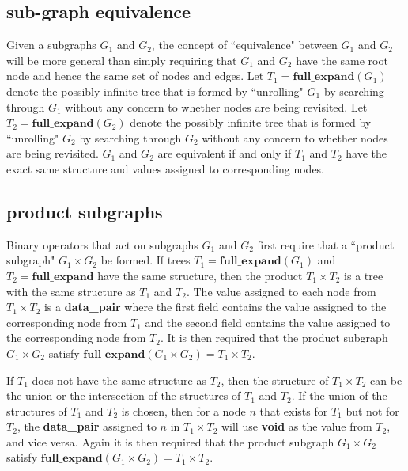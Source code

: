 \documentclass{article}
\begin{document}
\subsection{sub-graph equivalence}

Given a subgraphs \(G_1\) and \(G_2\), the concept of ``equivalence" between \(G_1\) and \(G_2\) will be more general than simply requiring that \(G_1\) and \(G_2\) have the same root node and hence the same set of nodes and edges. Let \(T_1 = \textbf{full\_expand}(G_1)\) denote the possibly infinite tree that is formed by ``unrolling" \(G_1\) by searching through \(G_1\) without any concern to whether nodes are being revisited. Let \(T_2 = \textbf{full\_expand}(G_2)\) denote the possibly infinite tree that is formed by ``unrolling" \(G_2\) by searching through \(G_2\) without any concern to whether nodes are being revisited. \(G_1\) and \(G_2\) are equivalent if and only if \(T_1\) and \(T_2\) have the exact same structure and values assigned to corresponding nodes.


\subsection{product subgraphs}

Binary operators that act on subgraphs \(G_1\) and \(G_2\) first require that a ``product subgraph" \(G_1 \times G_2\) be formed. If trees \(T_1 = \textbf{full\_expand}(G_1)\) and \(T_2 = \textbf{full\_expand}\) have the same structure, then the product \(T_1 \times T_2\) is a tree with the same structure as \(T_1\) and \(T_2\). The value assigned to each node from \(T_1 \times T_2\) is a \textbf{data\_pair} where the first field contains the value assigned to the corresponding node from \(T_1\) and the second field contains the value assigned to the corresponding node from \(T_2\). It is then required that the product subgraph \(G_1 \times G_2\) satisfy \(\textbf{full\_expand}(G_1 \times G_2) = T_1 \times T_2\). 

If \(T_1\) does not have the same structure as \(T_2\), then the structure of \(T_1 \times T_2\) can be the union or the intersection of the structures of \(T_1\) and \(T_2\). If the union of the structures of \(T_1\) and \(T_2\) is chosen, then for a node \(n\) that exists for \(T_1\) but not for \(T_2\), the \textbf{data\_pair} assigned to \(n\) in \(T_1 \times T_2\) will use \textbf{void} as the value from \(T_2\), and vice versa. Again it is then required that the product subgraph \(G_1 \times G_2\) satisfy \(\textbf{full\_expand}(G_1 \times G_2) = T_1 \times T_2\).  
\end{document}
